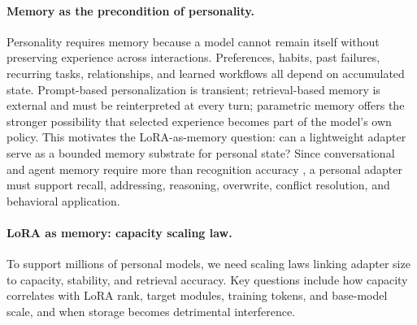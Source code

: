 \paragraph{Memory as the precondition of personality.} 
Personality requires memory because a model cannot remain itself without preserving experience across interactions. Preferences, habits, past failures, recurring tasks, relationships, and learned workflows all depend on accumulated state. Prompt-based personalization is transient; retrieval-based memory is external and must be reinterpreted at every turn; parametric memory offers the stronger possibility that selected experience becomes part of the model's own policy. This motivates the LoRA-as-memory question: can a lightweight adapter serve as a bounded memory substrate for personal state? Since conversational and agent memory require more than recognition accuracy \citep{packer2024memgpt,chhikara2025mem0,maharana2024longmemory}, a personal adapter must support recall, addressing, reasoning, overwrite, conflict resolution, and behavioral application.



\paragraph{LoRA as memory: capacity scaling law.}
To support millions of personal models, we need scaling laws linking adapter size to capacity, stability, and retrieval accuracy. Key questions include how capacity correlates with LoRA rank, target modules, training tokens, and base-model scale, and when storage becomes detrimental interference.


